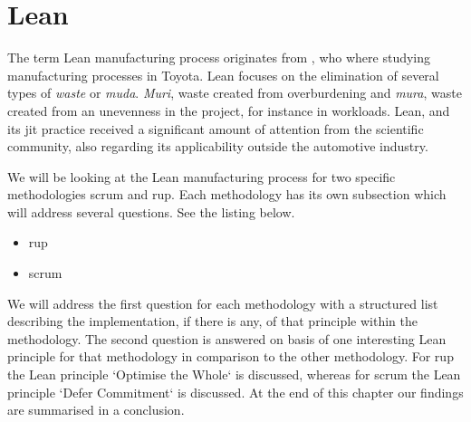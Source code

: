 \chapter{Lean}


The term Lean manufacturing process originates from \citep{womack1990machine}, who where studying manufacturing processes in Toyota. Lean focuses on the elimination of several types of \textit{waste} or \textit{muda}. \textit{Muri}, waste created from overburdening and \textit{mura}, waste created from an unevenness in the project, for instance in workloads. Lean, and its \ac{jit} practice received a significant amount of attention from the scientific community\citep{holweg2007genealogy}, also regarding its applicability outside the automotive industry.

We will be looking at the Lean manufacturing process for two specific methodologies \ac{scrum} and \ac{rup}. Each methodology has its own subsection which will address several questions. See the listing below.
\begin{itemize}
    \item \ac{rup}
    \item \ac{scrum}
\end{itemize}

We will address the first question for each methodology with a structured list describing the implementation, if there is any, of that principle within the methodology. The second question is answered on basis of one interesting Lean principle for that methodology in comparison to the other methodology. For \ac{rup} the Lean principle `Optimise the Whole` is discussed, whereas for \ac{scrum} the Lean principle `Defer Commitment` is discussed. At the end of this chapter our findings are summarised in a conclusion.

